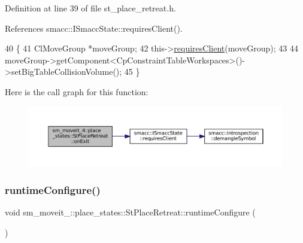 Definition at line 39 of file st\+\_\+place\+\_\+retreat.\+h.



References smacc\+::\+I\+Smacc\+State\+::requires\+Client().


\begin{DoxyCode}
40             \{
41                 ClMoveGroup *moveGroup;
42                 this->\hyperlink{classsmacc_1_1ISmaccState_a7f95c9f0a6ea2d6f18d1aec0519de4ac}{requiresClient}(moveGroup);
43 
44                 moveGroup->getComponent<CpConstraintTableWorkspaces>()->setBigTableCollisionVolume();
45             \}
\end{DoxyCode}
Here is the call graph for this function\+:
\nopagebreak
\begin{figure}[H]
\begin{center}
\leavevmode
\includegraphics[width=350pt]{structsm__moveit__4_1_1place__states_1_1StPlaceRetreat_a700f6a70e4c9836fef4b4b3e9546500d_cgraph}
\end{center}
\end{figure}
\mbox{\label{structsm__moveit__4_1_1place__states_1_1StPlaceRetreat_a592a95bb086fd10381dee175af55e71e}} 
\subsubsection{\texorpdfstring{runtime\+Configure()}{runtimeConfigure()}}
{\footnotesize\ttfamily void sm\+\_\+moveit\+\_\+::place\+\_\+states\+::\+St\+Place\+Retreat\+::runtime\+Configure (\begin{DoxyParamCaption}{ }\end{DoxyParamCaption})\hspace{0.3cm}{\ttfamily [inline]}}



